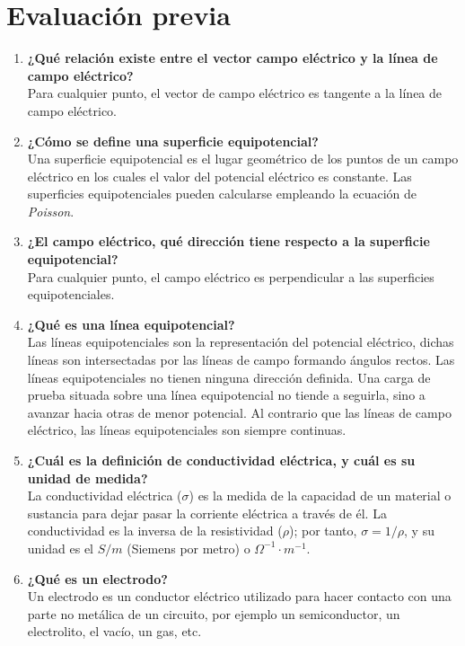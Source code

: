 \documentclass[letter,11pt]{article}
\begin{document}
\section{Evaluación previa}
\begin{enumerate}
\item \textbf{¿Qué relación existe entre el vector campo eléctrico y la línea de
campo eléctrico?} \\
Para cualquier punto, el vector de campo eléctrico es tangente a la línea de
campo eléctrico.

\item \textbf{¿Cómo se define una superficie equipotencial?} \\
Una superficie equipotencial es el lugar geométrico de los puntos de un campo
eléctrico en los cuales el valor del potencial eléctrico es constante. Las
superficies equipotenciales pueden calcularse empleando la ecuación de
\emph{Poisson}.

\item \textbf{¿El campo eléctrico, qué dirección tiene respecto a la superficie
equipotencial?} \\
Para cualquier punto, el campo eléctrico es perpendicular a las superficies
equipotenciales.

\item \textbf{¿Qué es una línea equipotencial?} \\
Las líneas equipotenciales son la representación del potencial eléctrico, dichas
líneas son intersectadas por las líneas de campo formando ángulos rectos. Las
líneas equipotenciales no tienen ninguna dirección definida. Una carga de prueba
situada sobre una línea equipotencial no tiende a seguirla, sino a avanzar hacia
otras de menor potencial. Al contrario que las líneas de campo eléctrico, las
líneas equipotenciales son siempre continuas.

\item \textbf{¿Cuál es la definición de conductividad eléctrica, y cuál es su
unidad de medida?} \\
La conductividad eléctrica ($\sigma$) es la medida de la capacidad de un
material o sustancia para dejar pasar la corriente eléctrica a través de él.
La conductividad es la inversa de la resistividad ($\rho$); por tanto,
$\sigma = 1 / \rho$, y su unidad es el $S/m$ (Siemens por metro) o
$\Omega^{-1} \cdot m^{-1}$.

\item \textbf{¿Qué es un electrodo?} \\
Un electrodo es un conductor eléctrico utilizado para hacer contacto con una
parte no metálica de un circuito, por ejemplo un semiconductor, un electrolito,
el vacío, un gas, etc.

\end{enumerate}
\end{document}
